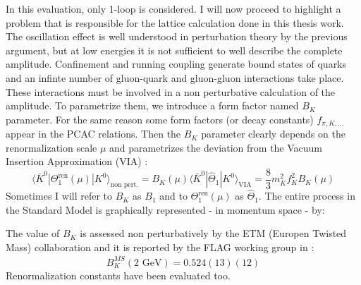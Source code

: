 \documentclass[english, LaM, oneside, noexaminfo]{sapthesis}
\newcommand{\la}{\langle}
\newcommand{\ra}{\rangle}
\newcommand{\gev}{\text{ GeV}}
\begin{document}
In this evaluation, only 1-loop is considered.
\newline
I will now proceed to highlight a problem that is responsible for the lattice calculation done in this thesis work.
The oscillation effect is well understood in perturbation theory by the previous argument, but at low energies it is not sufficient to well describe the complete amplitude.
Confinement and running coupling generate bound states of quarks and an infinte number of gluon-quark and gluon-gluon interactions take place.
These interactions must be involved in a non perturbative calculation of the amplitude.
To parametrize them, we introduce a form factor named $B_K$ parameter.
For the same reason some form factors (or decay constants) $f_{\pi,K,\dots}$ appear in the PCAC relations.
\newline
Then the $B_K$ parameter clearly depends on the renormalization scale $\mu$ and parametrizes the deviation from the Vacuum Insertion Approximation (VIA) \cite{BKetmcollaboration}:
\begin{equation}\label{eq:B_K-definition}
    \la \bar K^0 | \Theta_1^\text{ren} (\mu) | K^0 \ra_\text{non pert.} = B_K(\mu) \la \bar K^0 | \hat\Theta_1 | K^0 \ra_\text{VIA} = \frac{8}{3} m_K^2 f_K^2 B_K(\mu)
\end{equation}
Sometimes I will refer to $B_K$ as $B_1$ and to $\Theta_1^\text{ren} (\mu)$ as $\hat\Theta_1$.
The entire process in the Standard Model is graphically represented - in momentum space - by:
\begin{figure}[!h]
    \centering
\end{figure}
\newline
The value of $B_K$ is assessed non perturbatively by the ETM (Europen Twisted Mass) collaboration and it is reported by the FLAG working group in \cite{FLAG}\cite{ParticleDataGroup}:
\begin{equation}\label{B_K-value}
    B_K^{\overline{MS}}(2 \gev) = 0.524(13)(12)    
\end{equation}
Renormalization constants have been evaluated too.
\end{document}
